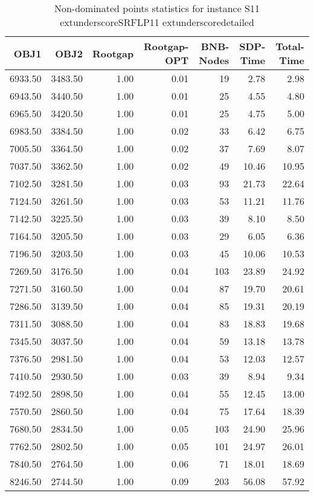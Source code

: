 \begin{table}
\caption{Non-dominated points statistics for instance S11	extunderscoreSRFLP11	extunderscoredetailed}
\label{tab:stats/S11_SRFLP11_detailed}
\begin{tabular}{rrrrrrr}
\toprule
OBJ1 & OBJ2 & Rootgap & Rootgap-OPT & BNB-Nodes & SDP-Time & Total-Time \\
\midrule
6933.50 & 3483.50 & 1.00 & 0.01 & 19 & 2.78 & 2.98 \\
6943.50 & 3440.50 & 1.00 & 0.01 & 25 & 4.55 & 4.80 \\
6965.50 & 3420.50 & 1.00 & 0.01 & 25 & 4.75 & 5.00 \\
6983.50 & 3384.50 & 1.00 & 0.02 & 33 & 6.42 & 6.75 \\
7005.50 & 3364.50 & 1.00 & 0.02 & 37 & 7.69 & 8.07 \\
7037.50 & 3362.50 & 1.00 & 0.02 & 49 & 10.46 & 10.95 \\
7102.50 & 3281.50 & 1.00 & 0.03 & 93 & 21.73 & 22.64 \\
7124.50 & 3261.50 & 1.00 & 0.03 & 53 & 11.21 & 11.76 \\
7142.50 & 3225.50 & 1.00 & 0.03 & 39 & 8.10 & 8.50 \\
7164.50 & 3205.50 & 1.00 & 0.03 & 29 & 6.05 & 6.36 \\
7196.50 & 3203.50 & 1.00 & 0.03 & 45 & 10.06 & 10.53 \\
7269.50 & 3176.50 & 1.00 & 0.04 & 103 & 23.89 & 24.92 \\
7271.50 & 3160.50 & 1.00 & 0.04 & 87 & 19.70 & 20.61 \\
7286.50 & 3139.50 & 1.00 & 0.04 & 85 & 19.31 & 20.19 \\
7311.50 & 3088.50 & 1.00 & 0.04 & 83 & 18.83 & 19.68 \\
7345.50 & 3037.50 & 1.00 & 0.04 & 59 & 13.18 & 13.78 \\
7376.50 & 2981.50 & 1.00 & 0.04 & 53 & 12.03 & 12.57 \\
7410.50 & 2930.50 & 1.00 & 0.03 & 39 & 8.94 & 9.34 \\
7492.50 & 2898.50 & 1.00 & 0.04 & 55 & 12.45 & 13.00 \\
7570.50 & 2860.50 & 1.00 & 0.04 & 75 & 17.64 & 18.39 \\
7680.50 & 2834.50 & 1.00 & 0.05 & 103 & 24.90 & 25.96 \\
7762.50 & 2802.50 & 1.00 & 0.05 & 101 & 24.97 & 26.01 \\
7840.50 & 2764.50 & 1.00 & 0.06 & 71 & 18.01 & 18.69 \\
8246.50 & 2744.50 & 1.00 & 0.09 & 203 & 56.08 & 57.92 \\

\end{tabular}
\end{table}
